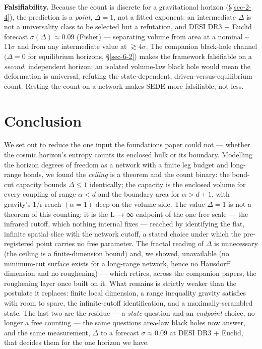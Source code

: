 \documentclass[aps,prd,preprint,nofootinbib,superscriptaddress]{revtex4-2}
\begin{document}
\textbf{Falsifiability.} Because the count is discrete for a
gravitational horizon (§\ref{sec-2-4}), the prediction is a
\emph{point}, \(\Delta  = 1\), not a fitted exponent: an intermediate
\(\Delta\) is not a universality class to be selected but a refutation,
and DESI DR3 + Euclid forecast \(\sigma (\Delta ) \approx  0.09\)
(Fisher) --- separating volume from area at a nominal
\textasciitilde{}\(11\sigma\) and from any intermediate value at
\(\gtrsim  4\sigma\). The companion black-hole channel \((\Delta  = 0\)
for equilibrium horizons, §\ref{sec-6-2}) makes the framework
falsifiable on a \emph{second}, independent horizon: an isolated
volume-law black hole would mean the deformation is universal, refuting
the state-dependent, driven-versus-equilibrium count. Resting the count
on a network makes SEDE more falsifiable, not less.

\section{Conclusion}\label{sec-9}

We set out to reduce the one input the foundations paper could not ---
whether the cosmic horizon's entropy counts its enclosed bulk or its
boundary. Modelling the horizon degrees of freedom as a network with a
finite leg budget and long-range bonds, we found the \emph{ceiling} is a
theorem and the count binary: the bond-cut capacity bounds
\(\Delta  \leq  1\) identically; the capacity is the enclosed volume for
every coupling of range \(\alpha  < d\) and the boundary area for
\(\alpha  > d+1\), with gravity's 1/r reach \((\alpha  = 1)\) deep on
the volume side. The value \(\Delta  = 1\) is not a theorem of this
counting: it is the L → ∞ endpoint of the one free scale --- the
infrared cutoff, which nothing internal fixes --- reached by identifying
the flat, infinite spatial slice with the network cutoff, a stated
choice under which the pre-registered point carries no free parameter.
The fractal reading of \(\Delta\) is unnecessary (the ceiling is a
finite-dimension bound) and, we showed, unavailable (no minimum-cut
surface exists for a long-range network, hence no Hausdorff dimension
and no roughening) --- which retires, across the companion papers, the
roughening layer once built on it. What remains is strictly weaker than
the postulate it replaces: finite local dimension, a range inequality
gravity satisfies with room to spare, the infinite-cutoff
identification, and a maximally-scrambled state. The last two are the
residue --- a \emph{state} question and an \emph{endpoint} choice, no
longer a free counting --- the same questions area-law black holes now
answer, and the same measurement, \(\Delta\) to a forecast
\(\sigma  \approx  0.09\) at DESI DR3 + Euclid, that decides them for
the one horizon we have.
\end{document}
